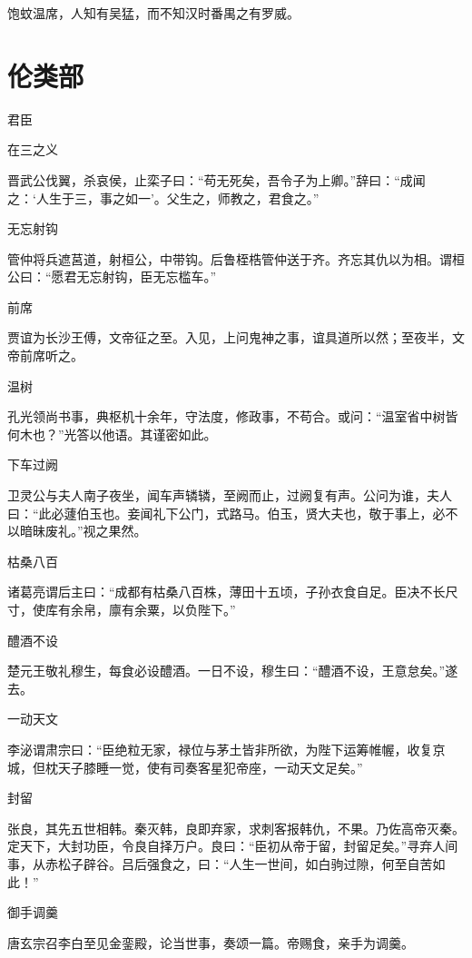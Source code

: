\documentclass[a4paper,12pt,UTF8,twoside]{ctexbook}
\begin{document}
    饱蚊温席，人知有吴猛，而不知汉时番禺之有罗威。
    
    
    
    \part{伦类部}
    
    君臣
    
    在三之义
    
    晋武公伐翼，杀哀侯，止栾子曰：“苟无死矣，吾令子为上卿。”辞曰：“成闻之：‘人生于三，事之如一’。父生之，师教之，君食之。”
    
    无忘射钩
    
    管仲将兵遮莒道，射桓公，中带钩。后鲁桎梏管仲送于齐。齐忘其仇以为相。谓桓公曰：“愿君无忘射钩，臣无忘槛车。”
    
    前席
    
    贾谊为长沙王傅，文帝征之至。入见，上问鬼神之事，谊具道所以然；至夜半，文帝前席听之。
    
    温树
    
    孔光领尚书事，典枢机十余年，守法度，修政事，不苟合。或问：“温室省中树皆何木也？”光答以他语。其谨密如此。
    
    下车过阙
    
    卫灵公与夫人南子夜坐，闻车声辚辚，至阙而止，过阙复有声。公问为谁，夫人曰：“此必蘧伯玉也。妾闻礼下公门，式路马。伯玉，贤大夫也，敬于事上，必不以暗昧废礼。”视之果然。
    
    枯桑八百
    
    诸葛亮谓后主曰：“成都有枯桑八百株，薄田十五顷，子孙衣食自足。臣决不长尺寸，使库有余帛，廪有余粟，以负陛下。”
    
    醴酒不设
    
    楚元王敬礼穆生，每食必设醴酒。一日不设，穆生曰：“醴酒不设，王意怠矣。”遂去。
    
    一动天文
    
    李泌谓肃宗曰：“臣绝粒无家，禄位与茅土皆非所欲，为陛下运筹帷幄，收复京城，但枕天子膝睡一觉，使有司奏客星犯帝座，一动天文足矣。”
    
    封留
    
    张良，其先五世相韩。秦灭韩，良即弃家，求刺客报韩仇，不果。乃佐高帝灭秦。定天下，大封功臣，令良自择万户。良曰：“臣初从帝于留，封留足矣。”寻弃人间事，从赤松子辟谷。吕后强食之，曰：“人生一世间，如白驹过隙，何至自苦如此！”
    
    御手调羹
    
    唐玄宗召李白至见金銮殿，论当世事，奏颂一篇。帝赐食，亲手为调羹。
    
\end{document}
